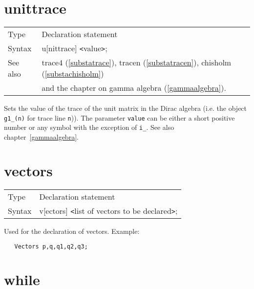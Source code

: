 
\section{unittrace}
\label{substaunittrace}

\noindent \begin{tabular}{ll}
Type & Declaration statement\\
Syntax & u[nittrace] {\tt<}value{\tt>}; \\
See also & trace4 (\ref{substatrace}), tracen (\ref{substatracen}),
    chisholm (\ref{substachisholm}) \\ &
    and the chapter on gamma algebra (\ref{gammaalgebra}).
\end{tabular} \vspace{4mm}

\noindent Sets the value of the trace of the 
unit matrix in the Dirac 
algebra (i.e. the object \verb:g1_(n): for trace line 
\verb:n:)). The parameter \verb:value: can be either a short positive 
number or any symbol with the exception of \verb:i_:. See also 
chapter~\ref{gammaalgebra}. \vspace{10mm}


\section{vectors}
\label{substavectors}

\noindent \begin{tabular}{ll}
Type & Declaration statement\\
Syntax & v[ectors] {\tt<}list of vectors to be declared{\tt>};
\end{tabular} \vspace{4mm}

\noindent Used for the declaration of vectors. Example:
\begin{verbatim}
   Vectors p,q,q1,q2,q3;
\end{verbatim}
\vspace{10mm}


\section{while}
\label{substawhile}

